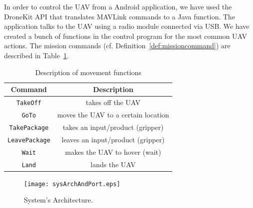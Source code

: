 \documentclass[12pt]{article}
\begin{document}
In order to control the UAV from a Android application, we have used the DroneKit API that translates MAVLink commands to a Java function. The application talks to the UAV using a radio module connected via USB. We have created a bunch of functions in the control program for the most common UAV actions. The mission commands (cf. Definition~\ref{def:missioncommand}) are described in Table~\ref{table:movfunc}.
%


\begin{table}[H]\caption{Description of movement functions}
\centering
\begin{tabular}{|c|c|}
\hline
\textbf{Command} & \textbf{Description} \\ \hline
\texttt{TakeOff}               &        takes off the UAV                                \\ \hline
\texttt{GoTo}      &                    moves the UAV to a certain location  \\ \hline
\texttt{TakePackage}               &    takes an input/product (gripper)                  \\ \hline
\texttt{LeavePackage}               &   leaves an input/product (gripper)                   \\ \hline
\texttt{Wait}                &          makes the UAV to hover (wait)            \\ \hline
\texttt{Land}                &          lands the UAV                                                  \\ \hline
\end{tabular}
\label{table:movfunc}
\end{table}

\begin{figure}[H]
	\centering
	\texttt{[image: sysArchAndPort.eps]}
	\caption{System's Architecture.\label{fig:sysArch}}
\end{figure}
\end{document}

